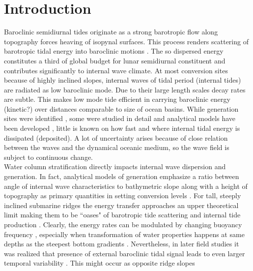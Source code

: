 \documentclass[12pt]{article}
\begin{document}
\section{Introduction}
Baroclinic semidiurnal tides originate as a strong barotropic flow along topography forces heaving 
of isopynal surfaces. This process renders scattering of barotropic tidal energy into baroclinic 
motions \citep{hendershott1981long}. The so dispersed energy constitutes a third of global budget 
for lunar semidiurnal constituent \citep{egbert2000significant, munk1997once} and contributes 
significantly to internal wave climate. At most conversion sites because of highly inclined 
slopes, internal waves of tidal period (internal tides) are radiated as low baroclinic mode. Due to 
their large length scales decay rates are subtle. This makes low mode tide efficient in carrying 
baroclinic energy (kinetic?) over distances comparable to size of ocean basins. While generation 
sites were identified \citep{morozov1995semidiurnal, simmons2004internal, arbic2010concurrent, 
zhao2016global}, some 
were studied in detail \citep{rudnick2003tides, klymak2011breaking, althaus2003internal} and 
analytical models have been developed \citep{garrett2007internal}, little is known on how fast and 
where internal tidal energy is dissipated (deposited). A lot of uncertainty arises because of close 
relation between the waves and the dynamical oceanic medium, so the wave field is subject to 
continuous change.\\
Water column stratification directly impacts internal wave dispersion and generation. In fact, 
analytical models 
of generation emphasize a ratio between angle of internal wave characteristics to bathymetric slope 
\citep{garrett2007internal} along with a height of topography as primary quantities in setting 
conversion levels \citep{llewellyn2003tidal, petrelis2006tidal}. For tall, steeply inclined 
submarine ridges the energy transfer approaches an upper theoretical limit 
\citep{petrelis2006tidal, st2003generation} making them to be ``oases" of barotropic tide 
scattering 
and internal tide production \citep{morozov1995semidiurnal, egbert2000significant}. Clearly, the 
energy rates can be modulated by changing buoyancy frequency \citep{holloway1999internal}, 
especially when transformation of water properties happens at same depths as the steepest 
bottom gradients 
\citep{gerkema2004internal}. Nevertheless, in later field studies it was realized that presence of 
external baroclinic tidal signal leads to even larger temporal variability \citep{Kelly2010a, 
zilberman2011incoherent, pickering2015structure}. This might occur as opposite ridge slopes 
\end{document}
